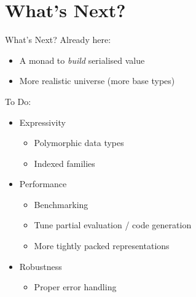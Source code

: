 
\section{What's Next?}

\begin{frame}{What's Next?}
Already here:
\begin{itemize}
  \item A monad to \emph{build} serialised value
  \item More realistic universe (more base types)
\end{itemize}
\bigskip
To Do:
\begin{itemize}
  \item Expressivity
  \begin{itemize}
    \item Polymorphic data types
    \item Indexed families
  \end{itemize}

  \item Performance
  \begin{itemize}
    \item Benchmarking
    \item Tune partial evaluation / code generation
    \item More tightly packed representations
  \end{itemize}

  \item Robustness
  \begin{itemize}
    \item Proper error handling
  \end{itemize}
\end{itemize}
\end{frame}
